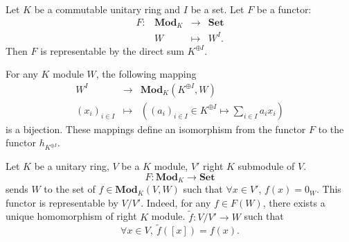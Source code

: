 \begin{exampleenv}
    Let $K$ be a commutable unitary ring and $I$ be a set. Let $F$ be a functor:
    $$ \begin{array}{rrcl}
        F: & \mathbf{Mod}_K & \rightarrow & \mathbf{Set}\\
        & W & \mapsto & W^I.
    \end{array}
    $$
    Then $F$ is representable by the direct sum $K^{\oplus I}$.
    
    \quad For any $K$ module $W$, the following mapping
    $$ \begin{array}{rcl}
        W^I & \rightarrow & \mathbf{Mod}_{K}\left(K^{\oplus I}, W\right)\\
        \left(x_i\right)_{i\in I} & \mapsto & \left(\left(a_i\right)_{i\in I} \in K^{\oplus I} \mapsto \sum_{i\in I} a_i x_i\right)
    \end{array}
    $$
    is a bijection. These mappings define an isomorphism from the functor $F$ to the functor $h_{K^{\oplus I}}$.
\end{exampleenv}
\begin{exampleenv}
    Let $K$ be a unitary ring, $V$ be a $K$ module, $V'$ right $K$ submodule of $V$.
    $$ F:\mathbf{Mod}_{K} \rightarrow \mathbf{Set}$$
    sends $W$ to the set of $f\in \mathbf{Mod}_K(V,W)$ such that $\forall x\in V'$, $f(x) = 0_W$.
    This functor is representable by $V/V'$. Indeed, for any $f\in F(W)$, there exists a unique homomorphism of right $K$ module.
    $\tilde{f}:V/V'\rightarrow W$ such that 
    $$ \forall x\in V,\ \tilde{f}\left([x]\right) =f(x).$$
\end{exampleenv}
